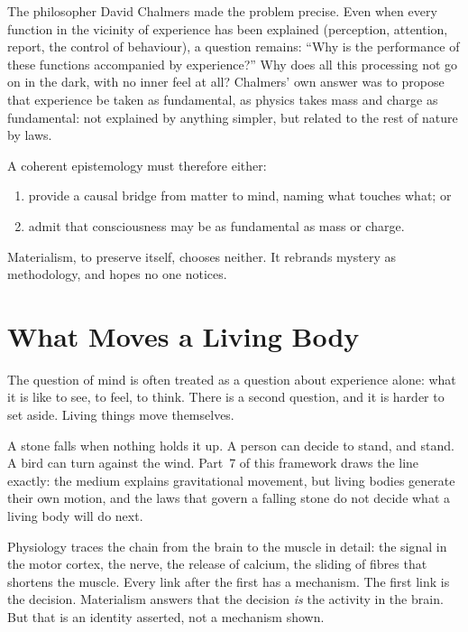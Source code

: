 \documentclass[11pt,a4paper]{article}
\begin{document}
The philosopher David Chalmers made the problem precise. Even when every function in the vicinity of experience has been explained (perception, attention, report, the control of behaviour), a question remains: ``Why is the performance of these functions accompanied by experience?'' Why does all this processing not go on in the dark, with no inner feel at all? Chalmers' own answer was to propose that experience be taken as fundamental, as physics takes mass and charge as fundamental: not explained by anything simpler, but related to the rest of nature by laws.

A coherent epistemology must therefore either:
\begin{enumerate}
  \item provide a causal bridge from matter to mind, naming what touches what; or
  \item admit that consciousness may be as fundamental as mass or charge.
\end{enumerate}
Materialism, to preserve itself, chooses neither. It rebrands mystery as methodology, and hopes no one notices.

\section{What Moves a Living Body}
\label{sec:living}

The question of mind is often treated as a question about experience alone: what it is like to see, to feel, to think. There is a second question, and it is harder to set aside. Living things move themselves.

A stone falls when nothing holds it up. A person can decide to stand, and stand. A bird can turn against the wind. Part~7 of this framework draws the line exactly: the medium explains gravitational movement, but living bodies generate their own motion, and the laws that govern a falling stone do not decide what a living body will do next.

Physiology traces the chain from the brain to the muscle in detail: the signal in the motor cortex, the nerve, the release of calcium, the sliding of fibres that shortens the muscle. Every link after the first has a mechanism. The first link is the decision. Materialism answers that the decision \emph{is} the activity in the brain. But that is an identity asserted, not a mechanism shown. 
\end{document}
